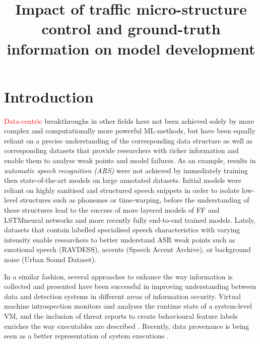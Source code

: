 \documentclass[sigconf]{acmart}
\begin{document}
 

\title{Impact of traffic micro-structure control and ground-truth information on model development}

\maketitle







\section{Introduction}

\textcolor{red}{Data-centric} breakthroughs in other fields have not been achieved solely by more complex and computationally more powerful ML-methods, but have been equally reliant on a precise understanding of the corresponding data structure as well as corresponding datasets that provide researchers with richer information and enable them to analyse weak points and model failures. As an example, results in \textit{automatic speech recognition (ARS)} were not achieved by immediately training then state-of-the-art models on large annotated datasets. Initial models were reliant on highly sanitised and structured speech snippets in order to isolate low-level structures such as phonemes or time-warping, before the understanding of these structures lead to the success of more layered models of FF and LSTMneural networks and more recently fully end-to-end trained models. Lately, datasets that contain labelled specialised speech characteristics with varying intensity enable researchers to better understand ASR weak points such as emotional speech (RAVDESS), accents (Speech Accent Archive), or background noise (Urban Sound Dataset).

In a similar fashion, several approaches to enhance the way information is collected and presented have been successful in improving understanding between data and detection systems in different areas of information security. Virtual machine introspection monitors and analyses the runtime state of a system-level VM, and the inclusion of threat reports to create behavioural feature labels enriches the way executables are described \cite{smith2020mind}. Recently, data provenance is being seen as a better representation of system  executions \cite{barre2019mining}. 
\end{document}

